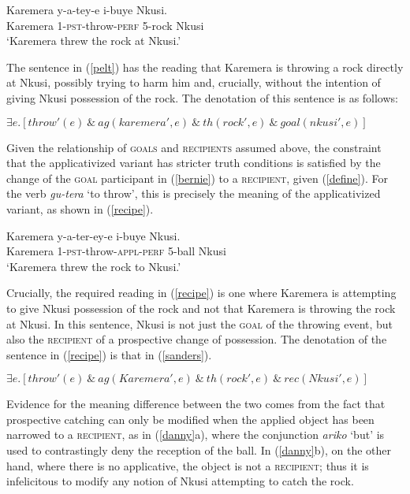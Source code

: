 \documentclass[output=paper]{langsci/langscibook}
\begin{document}
\begin{exe}
\ex\label{pelt}\gll Karemera y-a-tey-e i-buye Nkusi.\\
      Karemera 1-{\scshape pst-}throw-{\scshape perf} 5-rock Nkusi\\
      \glt `Karemera threw the rock at Nkusi.'
\end{exe}
The sentence in (\ref{pelt}) has the reading that Karemera is throwing a rock directly at Nkusi, possibly trying to harm him and, crucially, without the intention of giving Nkusi possession of the rock. The denotation of this sentence is as follows:
\begin{exe}
\ex\label{bernie} $\exists e.[throw'(e) \ \&\ ag(karemera', e) \ \&\ th(rock', e) \ \&\ goal(nkusi', e)]$ 

\end{exe}

Given the relationship of {\scshape goals} and {\scshape recipients} assumed above, the constraint that the applicativized variant has stricter truth conditions is satisfied by the change of the {\scshape goal} participant in (\ref{bernie}) to a {\scshape recipient}, given (\ref{define}).  For the verb \emph{gu-tera} `to throw', this is precisely the meaning of the applicativized variant, as shown in (\ref{recipe}). 

\begin{exe}
      \ex\label{recipe}\gll Karemera y-a-ter-ey-e i-buye Nkusi.\\
				      Karemera 1-{\scshape pst-}throw-{\scshape appl-perf}	5-ball Nkusi\\
				      \glt `Karemera threw the rock to Nkusi.'
\end{exe}
%
Crucially, the required reading in (\ref{recipe}) is one where Karemera is attempting to give Nkusi possession of the rock and not that Karemera is throwing the rock at Nkusi. In this sentence, Nkusi is not just the {\scshape goal} of the throwing event, but also the {\scshape recipient} of a prospective change of possession. The denotation of the sentence in (\ref{recipe}) is that in (\ref{sanders}).

\begin{exe}
\ex\label{sanders}  $\exists e.[throw'(e) \ \&\ ag(Karemera', e) \ \&\ th(rock', e) \ \&\ rec(Nkusi', e)]$ 
\end{exe}

Evidence for the meaning difference between the two comes from the fact that prospective catching can only be modified when the applied object has been narrowed to a {\scshape recipient}, as in (\ref{danny}a), where the conjunction \emph{ariko} `but' is used to contrastingly deny the reception of the ball.  In (\ref{danny}b), on the other hand, where there is no applicative, the object is not a {\scshape recipient}; thus it is infelicitous to modify any notion of Nkusi attempting to catch the rock. 
\end{document}
